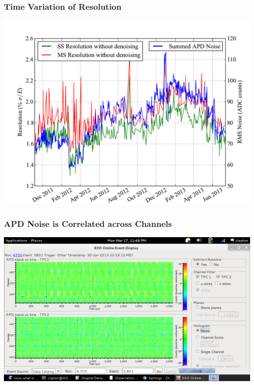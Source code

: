 \documentclass{beamer}
\begin{document}
\begin{frame}
\begin{center}
\frametitle{Time Variation of Resolution}
\end{center}
\vspace{1cm}
\includegraphics[keepaspectratio=true,width=\textwidth]{ResolutionAPDNoiseComparison.pdf}
\end{frame}

\begin{frame}
\begin{center}
\frametitle{APD Noise is Correlated across Channels}
\end{center}
\vspace{1cm}
\includegraphics[keepaspectratio=true,width=\textwidth,clip=true,trim=1mm 21mm 91mm 24mm]{Run4705Ev5801_noiseEventDisplay.png}\\
\end{frame}
\end{document}
